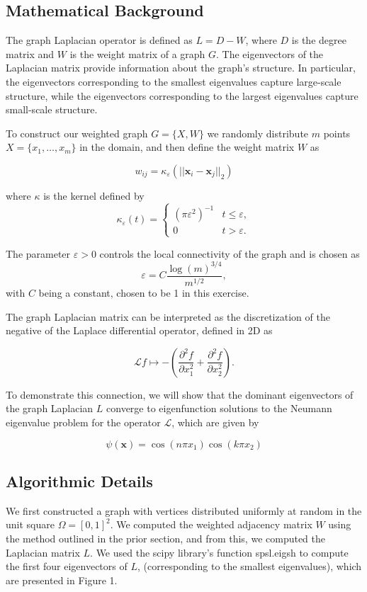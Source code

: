 \documentclass[12pt,a4paper]{article}
\theoremstyle{definition}
\theoremstyle{remark}
\begin{document}
\subsection{Mathematical Background}
The graph Laplacian operator is defined as $L = D - W$, where $D$ is the degree matrix and $W$ is the weight matrix of a graph $G$. The eigenvectors of the Laplacian matrix provide information about the graph's structure. In particular, the eigenvectors corresponding to the smallest eigenvalues capture large-scale structure, while the eigenvectors corresponding to the largest eigenvalues capture small-scale structure.

To construct our weighted graph $G=\{X, W\}$ we randomly distribute $m$ points $X=\{x_1, \dots, x_m\}$ in the domain, and then define the weight matrix $W$ as 

$$w_{ij} = \kappa_\varepsilon(||\mathbf x_i - \mathbf x_j||_2)$$

where $\kappa$ is the kernel defined by
\[
\kappa_\varepsilon(t) = \begin{cases}
(\pi \varepsilon^2)^{-1} & t \le \varepsilon, \\
0 & t > \varepsilon.
\end{cases}
\]

The parameter $\varepsilon >0$ controls the local connectivity of the graph and is chosen as
\[
\varepsilon = C \frac{\log(m)^{3/4}}{m^{1/2}},
\]
with $C$ being a constant, chosen to be 1 in this exercise.

The graph Laplacian matrix can be interpreted as the discretization of the negative of the Laplace differential operator, defined in 2D as 

\[
\mathcal{L} f \mapsto -\left(\frac{\partial^2 f}{\partial x_1^2} + \frac{\partial^2 f}{\partial x_2^2}\right).
\]

To demonstrate this connection, we will show that the dominant eigenvectors of the graph Laplacian $L$ converge to eigenfunction solutions to the Neumann eigenvalue problem for the operator $\mathcal L$, which are given by 

$$\psi(\mathbf x) = \cos(n \pi x_1) \cos(k\pi x_2)$$

\subsection{Algorithmic Details}
We first constructed a graph with vertices distributed uniformly at random in the unit square $\Omega=[0,1]^2$. We computed the weighted adjacency matrix $W$ using the method outlined in the prior section, and from this, we computed the Laplacian matrix $L$. We used the scipy library's function spsl.eigsh to compute the first four eigenvectors of $L$, (corresponding to the smallest eigenvalues), which are presented in Figure 1. 
\end{document}
